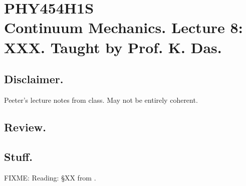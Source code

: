 
%

\chapter{PHY454H1S\\Continuum Mechanics.  Lecture 8: XXX.  Taught by Prof. K. Das.}
\label{chap:continuumL8}
{}
\date{Feb 3, 2012}

\beginArtWithToc

\section{Disclaimer.}

Peeter's lecture notes from class.  May not be entirely coherent.

\section{Review.}

\section{Stuff.}

FIXME: Reading: \S XX from \cite{landau1960theory}.

\EndArticle
